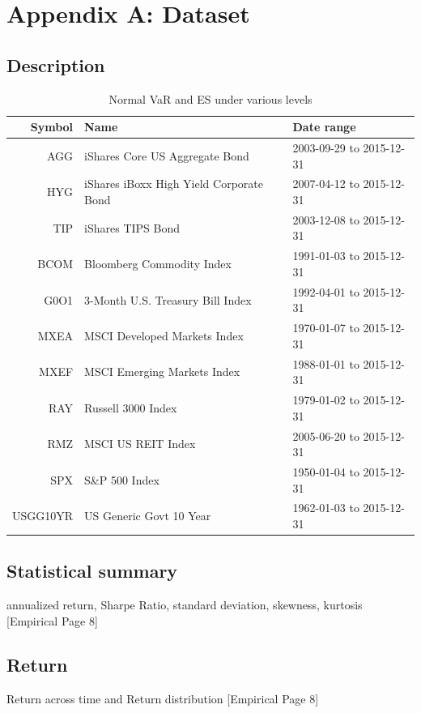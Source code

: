 \documentclass[11pt]{article}
\begin{document}
\clearpage

\newpage
\appendix
\section{Appendix A: Dataset} \label{App:AppendixA}
\subsection{Description}
\begin{table}[H]
\centering 
\begin{tabular}{ | r | p{7cm}  | p{4.5cm} | } 
 \hline 
Symbol & Name & Date range \\ \hline
AGG & iShares Core US Aggregate Bond & 2003-09-29 to 2015-12-31 \\
HYG & iShares iBoxx High Yield Corporate Bond & 2007-04-12 to 2015-12-31 \\
TIP & iShares TIPS Bond & 2003-12-08 to 2015-12-31 \\
BCOM & Bloomberg Commodity Index & 1991-01-03 to 2015-12-31 \\
G0O1 & 3-Month U.S. Treasury Bill Index & 1992-04-01 to 2015-12-31 \\
MXEA & MSCI Developed Markets Index & 1970-01-07 to 2015-12-31 \\
MXEF & MSCI Emerging Markets Index & 1988-01-01 to 2015-12-31 \\
RAY & Russell 3000 Index & 1979-01-02 to 2015-12-31 \\
RMZ & MSCI US REIT Index & 2005-06-20 to 2015-12-31 \\
SPX & S\&P 500 Index & 1950-01-04 to 2015-12-31 \\
USGG10YR & US Generic Govt 10 Year & 1962-01-03 to 2015-12-31 \\
 \hline
\end{tabular}
\caption{Normal VaR and ES under various levels}
\label{table:AssetDescription}
\end{table}


\subsection{Statistical summary}
annualized return, Sharpe Ratio, standard deviation, skewness, kurtosis [Empirical Page 8]

\subsection{Return}
Return across time and Return distribution [Empirical Page 8]
\end{document}
